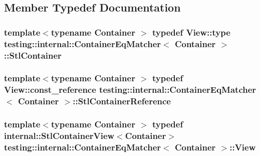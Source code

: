 \subsection{Member Typedef Documentation}
\subsubsection[{\texorpdfstring{Stl\+Container}{StlContainer}}]{\setlength{\rightskip}{0pt plus 5cm}template$<$typename Container $>$ typedef {\bf View\+::type} {\bf testing\+::internal\+::\+Container\+Eq\+Matcher}$<$ Container $>$\+::{\bf Stl\+Container}}\hypertarget{classtesting_1_1internal_1_1_container_eq_matcher_a8352d0190c372578d9a9a8457e0810db}{}\label{classtesting_1_1internal_1_1_container_eq_matcher_a8352d0190c372578d9a9a8457e0810db}
\subsubsection[{\texorpdfstring{Stl\+Container\+Reference}{StlContainerReference}}]{\setlength{\rightskip}{0pt plus 5cm}template$<$typename Container $>$ typedef {\bf View\+::const\+\_\+reference} {\bf testing\+::internal\+::\+Container\+Eq\+Matcher}$<$ Container $>$\+::{\bf Stl\+Container\+Reference}}\hypertarget{classtesting_1_1internal_1_1_container_eq_matcher_aaaeaacf0c557fe701a83e108d47edb23}{}\label{classtesting_1_1internal_1_1_container_eq_matcher_aaaeaacf0c557fe701a83e108d47edb23}
\subsubsection[{\texorpdfstring{View}{View}}]{\setlength{\rightskip}{0pt plus 5cm}template$<$typename Container $>$ typedef {\bf internal\+::\+Stl\+Container\+View}$<$Container$>$ {\bf testing\+::internal\+::\+Container\+Eq\+Matcher}$<$ Container $>$\+::{\bf View}}\hypertarget{classtesting_1_1internal_1_1_container_eq_matcher_a1565779cdc3d617fcdc8293f9b53c2a6}{}\label{classtesting_1_1internal_1_1_container_eq_matcher_a1565779cdc3d617fcdc8293f9b53c2a6}


